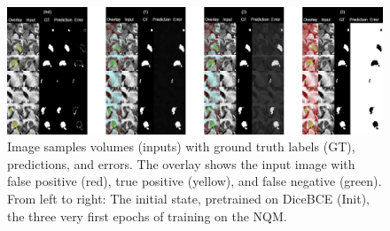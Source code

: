 \begin{figure}[h!]
    \centering
    \includegraphics[width=\linewidth]{Graphics/Experiments/4.2.1_Alternating_3epochs_v3.png}
    \caption{Image samples volumes (inputs) with ground truth labels (GT), predictions, and errors. The overlay shows the input image with false positive (red), true positive (yellow), and  false negative (green). From left to right: The initial state, pretrained on DiceBCE (Init), the three very first epochs of training on the NQM.}
    \label{fig:exp.02.1:alternating}
\end{figure}